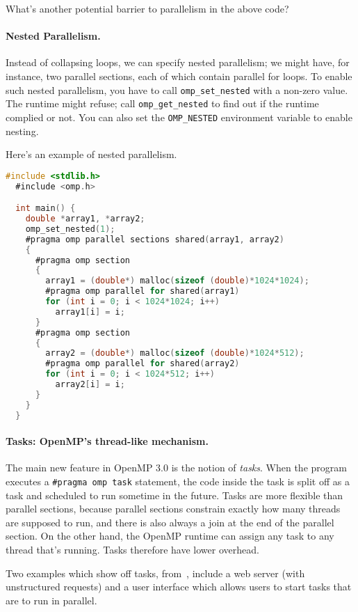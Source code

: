 \documentclass[11pt]{article}
\begin{document}
{\sf What's another potential barrier to parallelism in the above code?}\\

\paragraph{Nested Parallelism.} Instead of collapsing loops, we can
specify nested parallelism; we might have, for instance, two parallel
sections, each of which contain parallel for loops. To enable
such nested parallelism, you have to call \verb+omp_set_nested+ with
a non-zero value. The runtime might refuse; call \verb+omp_get_nested+ to
find out if the runtime complied or not. You can also set the 
\verb+OMP_NESTED+ environment variable to enable nesting.

Here's an example of nested parallelism.
{\small
\begin{lstlisting}[language=C]
  #include <stdlib.h>
  #include <omp.h>

  int main() {
    double *array1, *array2;
    omp_set_nested(1);
    #pragma omp parallel sections shared(array1, array2)
    {
      #pragma omp section
      {
        array1 = (double*) malloc(sizeof (double)*1024*1024);
        #pragma omp parallel for shared(array1)
        for (int i = 0; i < 1024*1024; i++)
          array1[i] = i;
      }
      #pragma omp section
      {
        array2 = (double*) malloc(sizeof (double)*1024*512);
        #pragma omp parallel for shared(array2)
        for (int i = 0; i < 1024*512; i++)
          array2[i] = i;
      }
    }
  }
\end{lstlisting}
}

\paragraph{Tasks: OpenMP's thread-like mechanism.}
The main new feature in OpenMP 3.0 is the notion of \emph{tasks}. When
the program executes a \verb+#pragma omp task+ statement, the code
inside the task is split off as a task and scheduled to run sometime
in the future. Tasks are more flexible than parallel sections, because
parallel sections constrain exactly how many threads are supposed to
run, and there is also always a join at the end of the parallel
section.  On the other hand, the OpenMP runtime can assign any task to
any thread that's running. Tasks therefore have lower overhead.

Two examples which show off tasks,
from~\cite{Ayguade:2009:DOT:1512157.1512430}, include a web server (with
unstructured requests) and a user interface which allows users to
start tasks that are to run in parallel.
\end{document}
